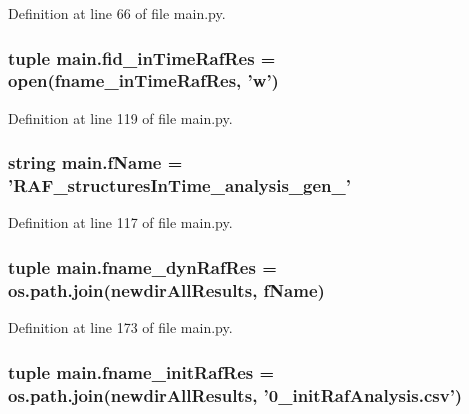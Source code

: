 Definition at line 66 of file main.\-py.

\hypertarget{a00117_ab82095abcedb97b7abf8e003f4724d0c}{
\subsubsection[{fid\-\_\-in\-Time\-Raf\-Res}]{\setlength{\rightskip}{0pt plus 5cm}tuple main.\-fid\-\_\-in\-Time\-Raf\-Res = open({\bf fname\-\_\-in\-Time\-Raf\-Res}, 'w')}}\label{a00117_ab82095abcedb97b7abf8e003f4724d0c}


Definition at line 119 of file main.\-py.

\hypertarget{a00117_a9fff4b23f9489649601960dabc4a6cdd}{
\subsubsection[{f\-Name}]{\setlength{\rightskip}{0pt plus 5cm}string main.\-f\-Name = 'R\-A\-F\-\_\-structures\-In\-Time\-\_\-analysis\-\_\-gen\-\_\-'}}\label{a00117_a9fff4b23f9489649601960dabc4a6cdd}


Definition at line 117 of file main.\-py.

\hypertarget{a00117_a6a031fb0c5a0a5519fc4c3f6d7ef35d1}{
\subsubsection[{fname\-\_\-dyn\-Raf\-Res}]{\setlength{\rightskip}{0pt plus 5cm}tuple main.\-fname\-\_\-dyn\-Raf\-Res = os.\-path.\-join({\bf newdir\-All\-Results}, {\bf f\-Name})}}\label{a00117_a6a031fb0c5a0a5519fc4c3f6d7ef35d1}


Definition at line 173 of file main.\-py.

\hypertarget{a00117_a72ed3f9434cc4dcc2240c6ca408960ff}{
\subsubsection[{fname\-\_\-init\-Raf\-Res}]{\setlength{\rightskip}{0pt plus 5cm}tuple main.\-fname\-\_\-init\-Raf\-Res = os.\-path.\-join({\bf newdir\-All\-Results}, '0\-\_\-init\-Raf\-Analysis.\-csv')}}\label{a00117_a72ed3f9434cc4dcc2240c6ca408960ff}


